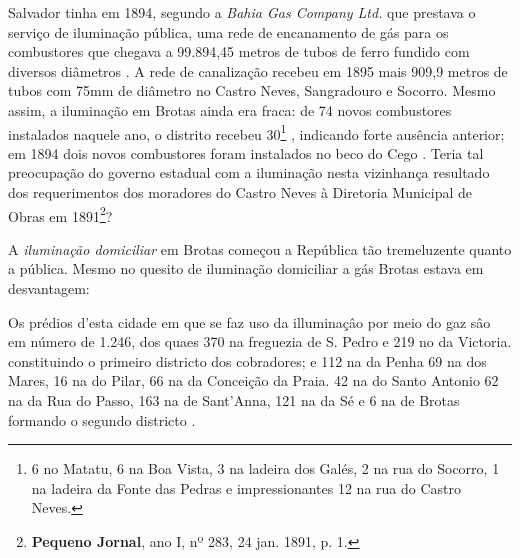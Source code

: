 Salvador tinha em 1894, segundo a \textit{Bahia Gas Company Ltd.} que prestava o serviço de iluminação pública, uma rede de encanamento de gás para os combustores que chegava a 99.894,45 metros de tubos de ferro fundido com diversos diâmetros \cite[p.~178]{salvador_relatorio_1894}. A rede de canalização recebeu em 1895 mais 909,9 metros de tubos com 75mm de diâmetro no Castro Neves, Sangradouro e Socorro. Mesmo assim, a iluminação em Brotas ainda era fraca: de 74 novos combustores instalados naquele ano, o distrito recebeu 30\footnote{6 no Matatu, 6 na Boa Vista, 3 na ladeira dos Galés, 2 na rua do Socorro, 1 na ladeira da Fonte das Pedras e impressionantes 12 na rua do Castro Neves.} \cite[pp.~149-150]{salvador_relatorio_1895}, indicando forte ausência anterior; em 1894 dois novos combustores foram instalados no beco do Cego \cite[p.~179]{salvador_relatorio_1894}. Teria tal preocupação do governo estadual com a iluminação nesta vizinhança resultado dos requerimentos dos moradores do Castro Neves à Diretoria Municipal de Obras em 1891\footnote{\textbf{Pequeno Jornal}, ano I, nº 283, 24 jan. 1891, p. 1.}? 

A \textit{iluminação domiciliar} em Brotas começou a República tão tremeluzente quanto a pública. Mesmo no quesito de iluminação domiciliar a gás Brotas estava em desvantagem:

\begin{citacao}
Os prédios d'esta cidade em que se faz uso da illuminaçâo por meio do gaz sâo em número de 1.246, dos quaes 370 na freguezia de S. Pedro e 219 no da Victoria. constituindo o primeiro districto dos cobradores; e 112 na da Penha 69 na dos Mares, 16 na do Pilar, 66 na da Conceição da Praia. 42 na do Santo Antonio 62 na da Rua do Passo, 163 na de Sant'Anna, 121 na da Sé e 6 na de Brotas formando o segundo districto \cite[p.~151]{salvador_relatorio_1895}. 
\end{citacao}

